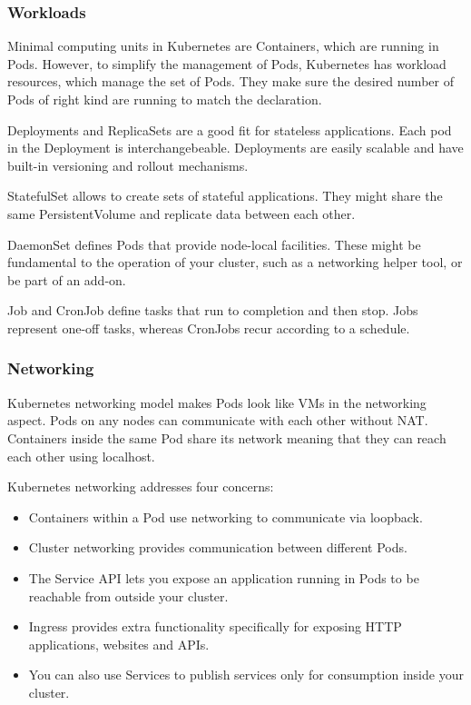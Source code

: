 \subsubsection*{Workloads}

Minimal computing units in Kubernetes are Containers, which are running in Pods. However, to simplify the management of Pods, Kubernetes has workload resources, which manage the set of Pods. They make sure the desired number of Pods of right kind are running to match the declaration.

Deployments and ReplicaSets are a good fit for stateless applications. Each pod in the Deployment is interchangebeable. Deployments are easily scalable and have built-in versioning and rollout mechanisms.

StatefulSet allows to create sets of stateful applications. They might share the same PersistentVolume and replicate data between each other.

DaemonSet defines Pods that provide node-local facilities. These might be fundamental to the operation of your cluster, such as a networking helper tool, or be part of an add-on.

Job and CronJob define tasks that run to completion and then stop. Jobs represent one-off tasks, whereas CronJobs recur according to a schedule.

\subsubsection*{Networking}

Kubernetes networking model makes Pods look like VMs in the networking aspect. Pods on any nodes can communicate with each other without NAT. Containers inside the same Pod share its network meaning that they can reach each other using localhost.

Kubernetes networking addresses four concerns:
\begin{itemize}[noitemsep]
\item Containers within a Pod use networking to communicate via loopback.
\item Cluster networking provides communication between different Pods.
\item The Service API lets you expose an application running in Pods to be reachable from outside your cluster.
\item Ingress provides extra functionality specifically for exposing HTTP applications, websites and APIs.
\item You can also use Services to publish services only for consumption inside your cluster.
\end{itemize}

